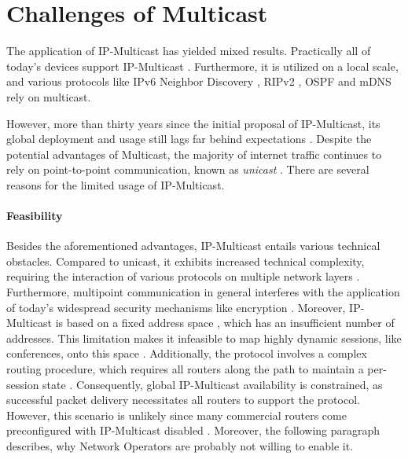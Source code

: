 \section{Challenges of Multicast} %
\label{sec:Challenges of Multicast}


The application of IP-Multicast has yielded mixed results.
Practically all of today's devices support IP-Multicast
    \cite{ratnasamy2006revisiting}.
Furthermore, it is utilized on a local scale, and various protocols like IPv6
    Neighbor Discovery \cite{rfc4861_ipv6_nd}, RIPv2 \cite{rfc2453_rip}, OSPF
    \cite{rfc2328_ospf} and mDNS \cite{rfc6762_mdns} rely on multicast.

However, more than thirty years since the initial proposal of IP-Multicast, its
    global deployment and usage still lags far behind expectations
    \cite{diot2000deployment, ratnasamy2006revisiting}.
Despite the potential advantages of Multicast, the majority of internet traffic
    continues to rely on point-to-point communication, known as
    \textit{unicast} \cite{universal_mc}.
There are several reasons for the limited usage of IP-Multicast.

\paragraph{Feasibility} %
\label{par:Feasibility}
Besides the aforementioned advantages, IP-Multicast entails various technical
    obstacles.
Compared to unicast, it exhibits increased technical complexity, requiring
    the interaction of various protocols on multiple network layers
    \cite{ratnasamy2006revisiting,diot2000deployment}.
Furthermore, multipoint communication in general interferes with the
    application of today's widespread security mechanisms like encryption
    \cite{rafaeli2003group_key_mgm}.
Moreover, IP-Multicast is based on a fixed address space \cite{rfc1112_ip4mc,
    rfc4291_ip6mc}, which has an insufficient number of addresses.
This limitation makes it infeasible to map highly dynamic sessions, like
    conferences, onto this space \cite{meadcast2}.
Additionally, the protocol involves a complex routing procedure, which requires
    all routers along the path to maintain a per-session state
    \cite{diot2000deployment, ratnasamy2006revisiting}.
Consequently, global IP-Multicast availability is constrained, as successful
    packet delivery necessitates all routers to support the protocol.
However, this scenario is unlikely since many commercial routers come
    preconfigured with IP-Multicast disabled \cite{aruba_doc}.
Moreover, the following paragraph describes, why Network Operators are probably
    not willing to enable it.

